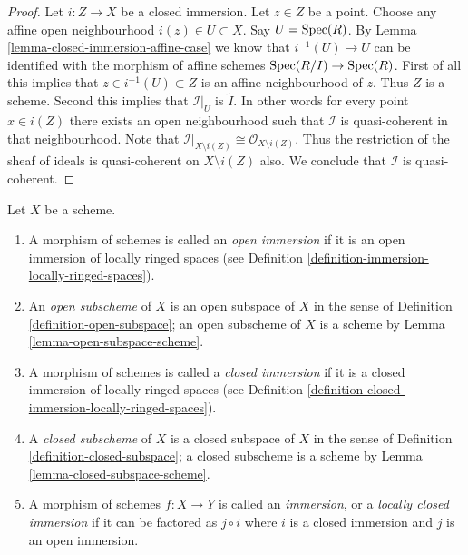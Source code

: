 \begin{proof}
Let $i : Z \to X$ be a closed immersion.
Let $z \in Z$ be a point. Choose any affine open
neighbourhood $i(z) \in U \subset X$. Say $U = \mathop{\mathrm{Spec}}(R)$.
By Lemma \ref{lemma-closed-immersion-affine-case} we know
that $i^{-1}(U) \to U$ can be identified with the morphism
of affine schemes $\mathop{\mathrm{Spec}}(R/I) \to \mathop{\mathrm{Spec}}(R)$.
First of all this implies that $z \in i^{-1}(U) \subset Z$ is an
affine neighbourhood of $z$. Thus $Z$ is a scheme. Second
this implies that $\mathcal{I}|_U$ is $\widetilde I$.
In other words for every point $x \in i(Z)$ there exists an
open neighbourhood such that $\mathcal{I}$ is quasi-coherent in
that neighbourhood. Note that $\mathcal{I}|_{X \setminus i(Z)}
\cong \mathcal{O}_{X \setminus i(Z)}$. Thus the restriction
of the sheaf of ideals is quasi-coherent on $X \setminus i(Z)$
also. We conclude that $\mathcal{I}$ is quasi-coherent.
\end{proof}

\begin{definition}
\label{definition-immersion}
\begin{reference}
\cite[Chapter II, \S 1, no. 31, p. 224]{FAC}
\end{reference}
Let $X$ be a scheme.
\begin{enumerate}
\item A morphism of schemes is called an {\it open immersion}
if it is an open immersion of locally ringed spaces (see
Definition \ref{definition-immersion-locally-ringed-spaces}).
\item An {\it open subscheme} of $X$ is an open subspace of $X$
in the sense of Definition \ref{definition-open-subspace}; an open subscheme
of $X$ is a scheme by Lemma \ref{lemma-open-subspace-scheme}.
\item A morphism of schemes is called a {\it closed immersion}
if it is a closed immersion of locally ringed spaces (see
Definition \ref{definition-closed-immersion-locally-ringed-spaces}).
\item A {\it closed subscheme} of $X$ is a closed subspace of $X$
in the sense of Definition \ref{definition-closed-subspace}; a closed subscheme
is a scheme by Lemma \ref{lemma-closed-subspace-scheme}.
\item A morphism of schemes $f : X \to Y$ is called an {\it immersion},
or a {\it locally closed immersion} if it can be factored as
$j \circ i$ where $i$ is a closed immersion and $j$ is an open
immersion.
\end{enumerate}
\end{definition}

